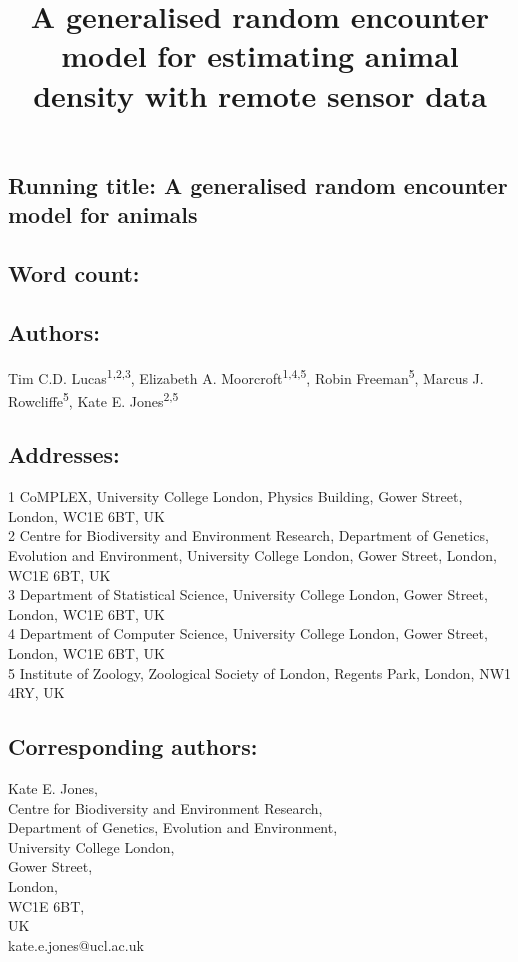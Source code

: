 \documentclass[a4paper,10pt,reqno,oneside]{amsart}
\begin{document}
\title[A generalised random encounter model for animals]{A generalised random encounter model for estimating animal density with remote sensor data}
\maketitle

\subsection*{ Running title: A generalised random encounter model for animals}

\subsection*{ Word count:}

\subsection*{ Authors:\\}
Tim C.D. Lucas\textsuperscript{1,2,3}, Elizabeth A. Moorcroft\textsuperscript{1,4,5}, Robin Freeman\textsuperscript{5}, Marcus J. Rowcliffe\textsuperscript{5}, Kate E. Jones\textsuperscript{2,5}


\subsection*{ Addresses:\\}
1 CoMPLEX, University College London, Physics Building, Gower Street, London, WC1E 6BT, UK\\ 
2 Centre for Biodiversity and Environment Research, Department of Genetics, Evolution and Environment, University College London, Gower Street, London, WC1E 6BT, UK\\ 
3 Department of Statistical Science, University College London, Gower Street, London, WC1E 6BT, UK\\ 
4 Department of Computer Science, University College London, Gower Street, London, WC1E 6BT, UK\\ 
5 Institute of Zoology, Zoological Society of London, Regents Park, London, NW1 4RY, UK


\subsection*{ Corresponding authors:\\}
Kate E. Jones,\\
Centre for Biodiversity and Environment Research,\\
Department of Genetics, Evolution and Environment,\\
University College London,\\
Gower Street,\\
London,\\
WC1E 6BT, \\
UK\\
kate.e.jones@ucl.ac.uk\\
\end{document}
